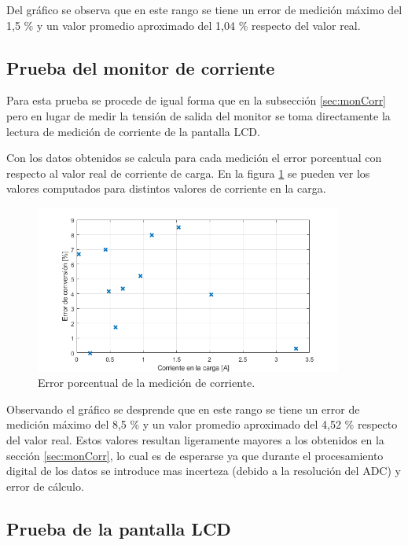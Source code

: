 Del gráfico se observa que en este rango se tiene un error de medición máximo del 1,5 \% y un valor promedio aproximado del 1,04 \% respecto del valor real.

\subsection{Prueba del monitor de corriente}

Para esta prueba se procede de igual forma que en la subsección \ref{sec:monCorr} pero en lugar de medir la tensión de salida del monitor se toma directamente la lectura de medición de corriente de la pantalla LCD.

Con los datos obtenidos se calcula para cada medición el error porcentual con respecto al valor real de corriente de carga. En la figura \ref{fig:testMonCorr2} se pueden ver los valores computados para distintos valores de corriente en la carga.

\begin{figure}[H]
\centering
\includegraphics[width=0.9\textwidth]{./Figures/testMonCorr2.png}
\caption{Error porcentual de la medición de corriente.}
\label{fig:testMonCorr2}
\end{figure}

Observando el gráfico se desprende que en este rango se tiene un error de medición máximo del 8,5 \% y un valor promedio aproximado del 4,52 \% respecto del valor real. Estos valores resultan ligeramente mayores a los obtenidos en la sección \ref{sec:monCorr}, lo cual es de esperarse ya que durante el procesamiento digital de los datos se introduce mas incerteza (debido a la resolución del ADC) y error de cálculo.

\subsection{Prueba de la pantalla LCD}

